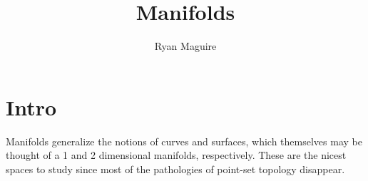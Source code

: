 \documentclass{article}                                                        %
\begin{document}
    \title{Manifolds}
    \author{Ryan Maguire}
    \date{\vspace{-5ex}}
    \maketitle
\section{Intro}
    Manifolds generalize the notions of curves and surfaces, which themselves
    may be thought of a 1 and 2 dimensional manifolds, respectively. These are
    the nicest spaces to study since most of the pathologies of point-set
    topology disappear.
\end{document}
